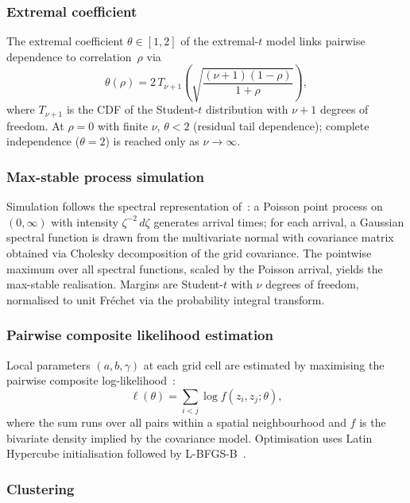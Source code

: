 \documentclass[a4paper]{elsarticle}
\begin{document}
\subsubsection{Extremal coefficient}

The extremal coefficient $\theta \in [1, 2]$ of the extremal-$t$ model
links pairwise dependence to correlation~$\rho$ via
\begin{equation}\label{eq:ec}
  \theta(\rho) = 2\, T_{\nu+1}\!\left(
    \sqrt{\frac{(\nu+1)(1-\rho)}{1+\rho}}\right),
\end{equation}
where $T_{\nu+1}$ is the CDF of the Student-$t$ distribution with
$\nu + 1$ degrees of freedom.
At $\rho = 0$ with finite $\nu$, $\theta < 2$ (residual tail dependence);
complete independence ($\theta = 2$) is reached only as $\nu \to \infty$.

\subsubsection{Max-stable process simulation}

Simulation follows the spectral representation of~\cite{schlather2002}:
a Poisson point process on $(0, \infty)$ with intensity $\zeta^{-2}\,d\zeta$
generates arrival times; for each arrival, a Gaussian spectral function
is drawn from the multivariate normal with covariance matrix obtained via
Cholesky decomposition of the grid covariance.
The pointwise maximum over all spectral functions, scaled by the Poisson
arrival, yields the max-stable realisation.
Margins are Student-$t$ with $\nu$ degrees of freedom, normalised to
unit Fr\'{e}chet via the probability integral transform.

\subsubsection{Pairwise composite likelihood estimation}

Local parameters $(a, b, \gamma)$ at each grid cell are estimated by
maximising the pairwise composite log-likelihood~\cite{padoan2010}:
\begin{equation}\label{eq:pcl}
  \ell(\theta) = \sum_{i < j} \log f(z_i, z_j; \theta),
\end{equation}
where the sum runs over all pairs within a spatial neighbourhood and
$f$ is the bivariate density implied by the covariance model.
Optimisation uses Latin Hypercube initialisation followed by
L-BFGS-B~\cite{byrd1995}.

\subsubsection{Clustering}
\end{document}
